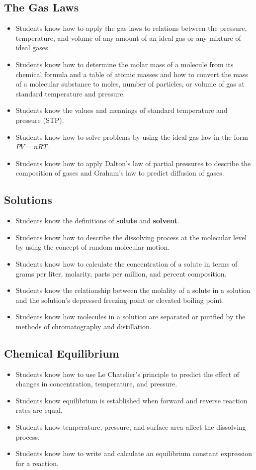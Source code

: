 \documentclass[11pt]{article}
\begin{document}
\subsection{The Gas Laws}
\label{sec:org3315ce2}
\begin{itemize}
\item Students know how to apply the gas laws to relations between the pressure, temperature, and volume of any amount of an ideal gas or any mixture of ideal gases.
\item Students know how to determine the molar mass of a molecule from its chemical formula and a table of atomic masses and how to convert the mass of a molecular substance to moles, number of particles, or volume of gas at standard temperature and pressure.
\item Students know the values and meanings of standard temperature and pressure (STP).
\item Students know how to solve problems by using the ideal gas law in the form \(PV = nRT\).
\item Students know how to apply Dalton's law of partial pressures to describe the composition of gases and Graham's law to predict diffusion of gases.
\end{itemize}
\subsection{Solutions}
\label{sec:orgc674cd6}
\begin{itemize}
\item Students know the definitions of \textbf{solute} and \textbf{solvent}.
\item Students know how to describe the dissolving process at the molecular level by using the concept of random molecular motion.
\item Students know how to calculate the concentration of a solute in terms of grams per liter, molarity, parts per million, and percent composition.
\item Students know the relationship between the molality of a solute in a solution and the solution's depressed freezing point or elevated boiling point.
\item Students know how molecules in a solution are separated or purified by the methods of chromatography and distillation.
\end{itemize}
\subsection{Chemical Equilibrium}
\label{sec:orgcbfdd6d}
\begin{itemize}
\item Students know how to use Le Chatelier's principle to predict the effect of changes in concentration, temperature, and pressure.
\item Students know equilibrium is established when forward and reverse reaction rates are equal.
\item Students know temperature, pressure, and surface area affect the dissolving process.
\item Students know how to write and calculate an equilibrium constant expression for a reaction.
\end{itemize}
\end{document}
